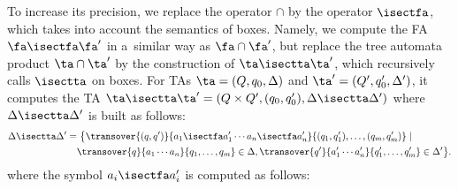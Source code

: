 To increase its precision, we replace the operator $\cap$ by the operator $\isectfa$, which takes into account the semantics of boxes.
%
Namely, we compute the FA $\fa\isectfa\fa'$ in a~similar way as $\fa\cap\fa'$, but replace the tree
automata product $\ta\cap\ta'$ by the construction of $\ta\isectta\ta'$, which recursively calls $\isectta$ on boxes.
For TAs $\ta = (Q, q_0, \Delta)$ and $\ta' = (Q',q_0', \Delta')$, it computes the  TA
$\ta\isectta\ta' = (Q \times Q', (q_0, q_0'), \Delta\isectta\Delta')$ where
$\Delta\isectta\Delta'$ is built as follows:
    \begin{align*}
    \Delta\isectta\Delta' = &\  \big\{  \transover{(q, q')}{a_1\isectfa a_1'\cdots a_n\isectfa a_n'}{(q_1, q'_1), \ldots,
      (q_m, q'_m)} \mid\\ & \transover{q}{a_1\cdots a_n}{q_1, \ldots, q_m}
      \in \Delta,
      \transover{q'}{a_1'\cdots a_n'}{q'_1, \ldots, q'_m} \in \Delta'
      \big\}.
    \end{align*} where the symbol $a_i\isectfa a_i'$ is computed as follows:
